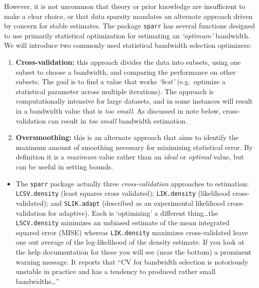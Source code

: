 \documentclass[
]{book}
\newcommand{\passthrough}[1]{#1}
\providecommand{\tightlist}{%
  \setlength{\itemsep}{0pt}\setlength{\parskip}{0pt}}
\newenvironment{rmdblock}[1]
  {%
  \begin{itemize}
  \renewcommand{\labelitemi}{
    \raisebox{-.7\height}[0pt][0pt]{
      {\setkeys{Gin}{width=3em,keepaspectratio}\texttt{[image: images/\#1]}}
    }
  }
  \item
  }
  {
  \end{itemize}
  }
\newenvironment{rmdnote}
  {\begin{rmdblock}{note}}
  {\end{rmdblock}}
\begin{document}
However, it is not uncommon that theory or prior knowledge are insufficient to make a clear choice, or that data sparsity mandates an alternate approach driven by concern for stable estimates. The package \passthrough{\lstinline!sparr!} has several functions designed to use primarily statistical optimization for estimating an \emph{`optimum'} bandwidth. We will introduce two commonly used statistical bandwidth selection optimizers:

\begin{enumerate}
\def\labelenumi{\arabic{enumi}.}
\tightlist
\item
  \textbf{Cross-validation:} this approach divides the data into subsets, using one subset to choose a bandwidth, and comparing the performance on other subsets. The goal is to find a value that works \emph{`best'} (e.g.~optimize a statistical parameter across multiple iterations). The approach is computationally intensive for large datasets, and in some instances will result in a bandwidth value that is \emph{too small}. As discussed in note below, cross-validation can result in \emph{too small} bandwidth estimation.
\item
  \textbf{Oversmoothing:} this is an alternate approach that aims to identify the maximum amount of smoothing necessary for minimizing statistical error. By definition it is a \emph{maximum} value rather than an \emph{ideal} or \emph{optimal} value, but can be useful in setting bounds.
\end{enumerate}

\begin{rmdnote}
The \passthrough{\lstinline!sparr!} package actually three \emph{cross-validation} approaches to estimation: \passthrough{\lstinline!LCSV.density!} (least squares cross validated); \passthrough{\lstinline!LIK.density!} (likelihood cross-validated); and \passthrough{\lstinline!SLIK.adapt!} (described as an experimental likelihood cross-validation for adaptive). Each is `optimizing' a different thing\ldots the \passthrough{\lstinline!LSCV.density!} minimizes an unbiased estimate of the mean integrated squared error (MISE) whereas \passthrough{\lstinline!LIK.density!} maximizes cross-validated leave one out average of the log-likelihood of the density estimate.
If you look at the help documentation for these you will see (near the bottom) a prominent warning message. It reports that ``CV for bandwidth selection is notoriously unstable in practice and has a tendency to produced rather small bandwidths\ldots{}''\\
\end{rmdnote}
\end{document}
